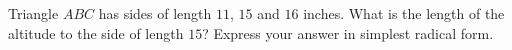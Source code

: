 Triangle $ABC$ has sides of length $11$, $15$ and $16$ inches. What is the length of the altitude to the side of length $15$? Express your answer in simplest radical form.
